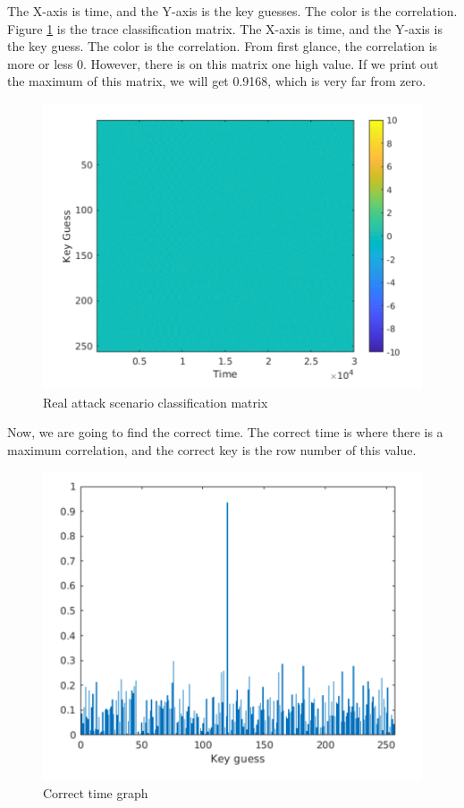 The X-axis is time, and the Y-axis is the key guesses. The color is the
correlation. Figure \ref{c8_Matlab_classification_matrix:fig} is the trace
classification matrix. The X-axis is time, and the Y-axis is the key guess. The
color is the correlation. From first glance, the correlation is more or less
0. However, there is on this matrix one high value. If we print out the
maximum of this matrix, we will get 0.9168, which is very far from zero.

\begin{figure}[!ht]
    \centering
    \includegraphics[width=1.0\textwidth]{images/chapter8/real_attack_classification_matrix.png}
    \caption{Real attack scenario classification matrix} \label{c8_Matlab_classification_matrix:fig}
\end{figure}

Now, we are going to find the correct time. The correct time is where there is a
maximum correlation, and the correct key is the row number of this value.  

\begin{figure}[!ht]
    \centering
    \includegraphics[width=1.0\textwidth]{images/chapter8/correct_time_graph.png}
    \caption{Correct time graph} \label{c8_Matlab_correct_time:fig}
\end{figure}

